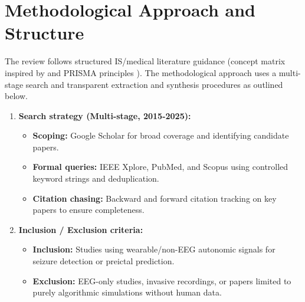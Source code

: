 \section{Methodological Approach and Structure}
The review follows structured IS/medical literature guidance (concept
matrix inspired by \parencite{websterAnalyzingPrepareFuture2002} and PRISMA
principles \parencite{tugwellPRISMA20202021}). The methodological approach uses a multi-stage search and
transparent extraction and synthesis procedures as outlined below.

\begin{enumerate}
  \item \textbf{Search strategy (Multi-stage, 2015-2025):}
    \begin{itemize}
      \item \textbf{Scoping:} Google Scholar for broad coverage and
        identifying candidate papers.
      \item \textbf{Formal queries:} IEEE Xplore, PubMed, and Scopus
        using controlled keyword strings and deduplication.
      \item \textbf{Citation chasing:} Backward and forward citation
        tracking on key papers to ensure completeness.
    \end{itemize}
  \item \textbf{Inclusion / Exclusion criteria:}
    \begin{itemize}
      \item \textbf{Inclusion:} Studies using wearable/non-EEG autonomic
        signals for seizure detection or preictal prediction.
      \item \textbf{Exclusion:} EEG-only studies, invasive recordings,
        or papers limited to purely algorithmic simulations without
        human data.
    \end{itemize}
\end{enumerate}



